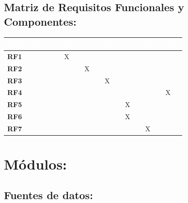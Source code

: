 \documentclass[12pt,a4paper]{article}
\begin{document}
                
    \subsection{\textbf{Matriz de Requisitos Funcionales y Componentes:}}
                
                    \begin{table}[H]
                        \centering
                        \begin{tabularx}{\textwidth}{|X|p{1cm}|p{1cm}|p{1cm}|p{1cm}|p{1cm}|p{1cm}|}
                            \hline
                            \rowcolor{black} 
                            \textcolor{white}{Requerimiento} & \textcolor{white}{M.1} & \textcolor{white}{M.2} & \textcolor{white}{M.3} & \textcolor{white}{M.4} & \textcolor{white}{M.5} & \textcolor{white}{M.6}  \\ \hline
                            
                            \textbf{RF1} & X & & & & & \\ \hline
                            \textbf{RF2} & & X & & & & \\ \hline
                            \textbf{RF3} & & & X & & & \\ \hline
                            \textbf{RF4} & & & & & & X \\ \hline
                            \textbf{RF5} & & & & X & & \\ \hline
                            \textbf{RF6} & & & & X & & \\ \hline
                            \textbf{RF7} & & & &  & X & \\ \hline
                        \end{tabularx}
                    \end{table}
    
    \section{Módulos:}
    \subsection{Fuentes de datos:}
\end{document}
